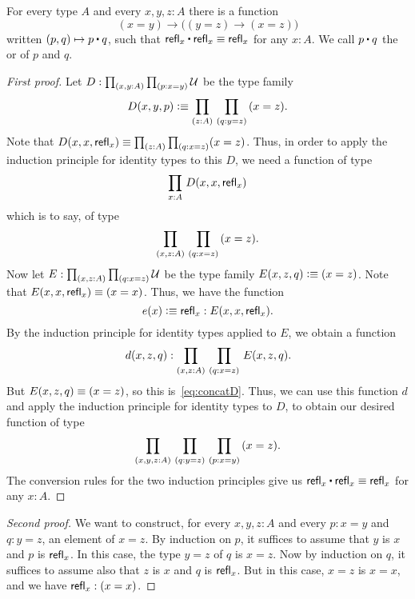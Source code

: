 \begin{lem}\label{lem:concat}
  For every type $A$ and every $x,y,z:A$ there is a function
  \begin{equation*}
  (x= y) \to   \big((y= z)\to (x=  z)\big)
  \end{equation*}
  written $(p,q)\mapsto p\ct q$, such that $\refl{x}\ct \refl{x}\jdeq \refl{x}$ for any $x:A$.
  We call $p\ct q$ the  or  of $p$ and $q$.
\end{lem}

\begin{proof}[First proof]
  Let $D:\prd{x,y:A}{p:x=y} \type$ be the type family
  \begin{equation*}
    D(x,y,p)\defeq \prd{z:A}{q:y=z} (x=z).
  \end{equation*}
  Note that $D(x,x,\refl x) \jdeq \prd{z:A}{q:x=z} (x=z)$.
  Thus, in order to apply the induction principle for identity types to this $D$, we need a function of type
  \begin{equation}\label{eq:concatD}
    \prd{x:A} D(x,x,\refl{x})
  \end{equation}
  which is to say, of type
  \[ \prd{x,z:A}{q:x=z} (x=z). \]
  Now let $E:\prd{x,z:A}{q:x=z}\type$ be the type family $E(x,z,q)\vcentcolon\equiv (x=z)$.
  Note that $E(x,x,\mathsf{refl}_{x}) \equiv (x=x)$.
  Thus, we have the function
  \begin{equation*}
    e(x) \vcentcolon\equiv \mathsf{refl}_{x} : E(x,x,\mathsf{refl}_{x}).
  \end{equation*}
  By the induction principle for identity types applied to $E$, we obtain a function
  \begin{equation*}
    d(x,z,q) : \prd{x,z:A}{q:x=z} E(x,z,q).
  \end{equation*}
  But $E(x,z,q)\equiv (x=z)$, so this is~\eqref{eq:concatD}.
  Thus, we can use this function $d$ and apply the induction principle for identity types to $D$, to obtain our desired function of type
  \begin{equation*}
    \prd{x,y,z:A}{q:y=z}{p:x=y} (x=z).
  \end{equation*}
  The conversion rules for the two induction principles give us $\refl{x}\ct \refl{x}\jdeq \refl{x}$ for any $x:A$.
\end{proof}

\begin{proof}[Second proof]
  We want to construct, for every $x,y,z:A$ and every $p:x=y$ and $q:y=z$, an element of $x=z$.
  By induction on $p$, it suffices to assume that $y$ is $x$ and $p$ is $\mathsf{refl}_{x}$.
  In this case, the type $y=z$ of $q$ is $x=z$.
  Now by induction on $q$, it suffices to assume also that $z$ is $x$ and $q$ is $\mathsf{refl}_{x}$.
  But in this case, $x=z$ is $x=x$, and we have $\mathsf{refl}_{x}:(x=x)$.
\end{proof}

